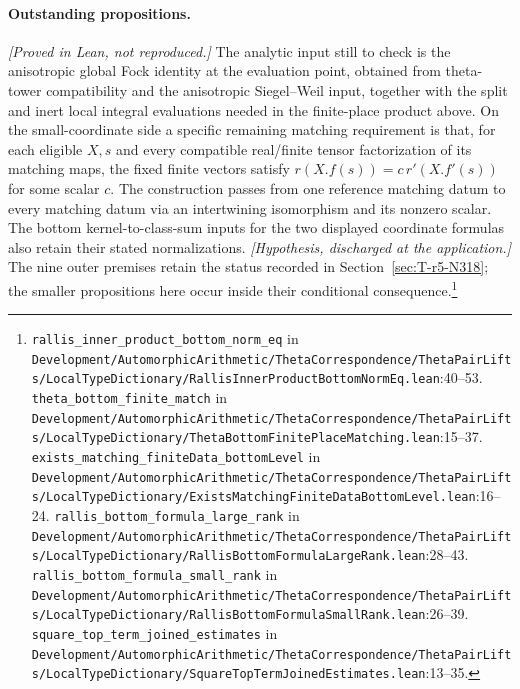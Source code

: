 \paragraph{Outstanding propositions.}
\textit{[Proved in Lean, not reproduced.]} The analytic input still to check is the anisotropic global Fock identity at the evaluation point, obtained from theta-tower compatibility and the anisotropic Siegel--Weil input, together with the split and inert local integral evaluations needed in the finite-place product above. On the small-coordinate side a specific remaining matching requirement is that, for each eligible $X,s$ and every compatible real/finite tensor factorization of its matching maps, the fixed finite vectors satisfy $r(X.f(s))=c\,r'(X.f'(s))$ for some scalar $c$. The construction passes from one reference matching datum to every matching datum via an intertwining isomorphism and its nonzero scalar. The bottom kernel-to-class-sum inputs for the two displayed coordinate formulas also retain their stated normalizations. \textit{[Hypothesis, discharged at the application.]} The nine outer premises retain the status recorded in Section~\ref{sec:T-r5-N318}; the smaller propositions here occur inside their conditional consequence.\footnote{\nolinkurl{rallis_inner_product_bottom_norm_eq} in \nolinkurl{Development/AutomorphicArithmetic/ThetaCorrespondence/ThetaPairLifts/LocalTypeDictionary/RallisInnerProductBottomNormEq.lean}\allowbreak:40--53. \nolinkurl{theta_bottom_finite_match} in \nolinkurl{Development/AutomorphicArithmetic/ThetaCorrespondence/ThetaPairLifts/LocalTypeDictionary/ThetaBottomFinitePlaceMatching.lean}\allowbreak:15--37. \nolinkurl{exists_matching_finiteData_bottomLevel} in \nolinkurl{Development/AutomorphicArithmetic/ThetaCorrespondence/ThetaPairLifts/LocalTypeDictionary/ExistsMatchingFiniteDataBottomLevel.lean}\allowbreak:16--24. \nolinkurl{rallis_bottom_formula_large_rank} in \nolinkurl{Development/AutomorphicArithmetic/ThetaCorrespondence/ThetaPairLifts/LocalTypeDictionary/RallisBottomFormulaLargeRank.lean}\allowbreak:28--43. \nolinkurl{rallis_bottom_formula_small_rank} in \nolinkurl{Development/AutomorphicArithmetic/ThetaCorrespondence/ThetaPairLifts/LocalTypeDictionary/RallisBottomFormulaSmallRank.lean}\allowbreak:26--39. \nolinkurl{square_top_term_joined_estimates} in \nolinkurl{Development/AutomorphicArithmetic/ThetaCorrespondence/ThetaPairLifts/LocalTypeDictionary/SquareTopTermJoinedEstimates.lean}\allowbreak:13--35.}

